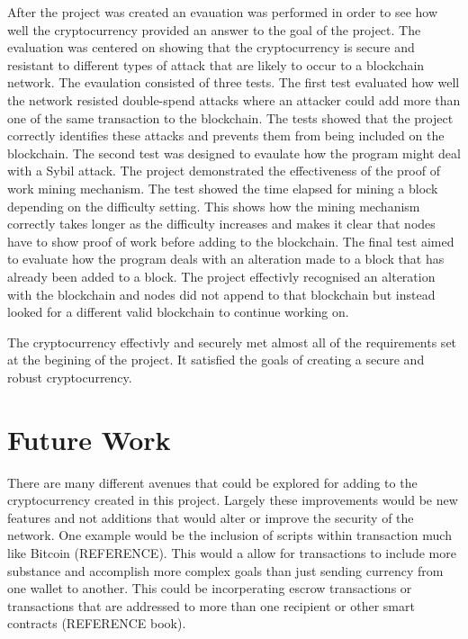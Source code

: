 \documentclass{l4proj}
\begin{document}
After the project was created an evauation was performed in order to see how well the cryptocurrency provided an answer
to the goal of the project. The evaluation was centered on showing that the cryptocurrency is secure and resistant to 
different types of attack that are likely to occur to a blockchain network. The evaulation consisted of three tests.
The first test evaluated how well the network resisted double-spend attacks where an attacker could add more than one
of the same transaction to the blockchain. The tests showed that the project correctly identifies these attacks and
prevents them from being included on the blockchain. The second test was designed to evaulate how the program might
deal with a Sybil attack. The project demonstrated the effectiveness of the proof of work mining mechanism. The test 
showed the time elapsed for mining a block depending on the difficulty setting. This shows how the mining mechanism 
correctly takes longer as the difficulty increases and makes it clear that nodes have to show proof of work before
adding to the blockchain. The final test aimed to evaluate how the program deals with an alteration made to a block
that has already been added to a block. The project effectivly recognised an alteration with the blockchain and 
nodes did not append to that blockchain but instead looked for a different valid blockchain to continue working on.

The cryptocurrency effectivly and securely met almost all of the requirements set at the begining of the project. It
satisfied the goals of creating a secure and robust cryptocurrency.


\section{Future Work}
There are many different avenues that could be explored for adding to the cryptocurrency created in this project. 
Largely these improvements would be new features and not additions that would alter or improve the security of the
network. One example would be the inclusion of scripts within transaction much like Bitcoin (REFERENCE). This would a
allow for transactions to include more substance and accomplish more complex goals than just sending currency from 
one wallet to another. This could be incorperating escrow transactions or transactions that are addressed to more than
one recipient or other smart contracts (REFERENCE book).
\end{document}
